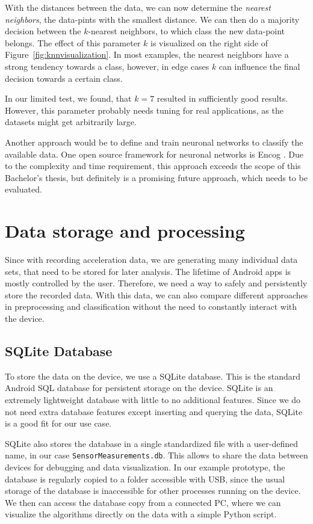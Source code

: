 With the distances between the data, we can now determine the \emph{nearest neighbors}, \ie the data-pints with the smallest distance. We can then do a majority decision between the $k$-nearest neighbors, to which class the new data-point belongs. The effect of this parameter $k$ is visualized on the right side of Figure~\ref{fig:knnvisualization}. In most examples, the nearest neighbors have a strong tendency towards a class, however, in edge cases $k$ can influence the final decision towards a certain class.

In our limited test, we found, that $k = 7$ resulted in sufficiently good results. However, this parameter probably needs tuning for real applications, as the datasets might get arbitrarily large.

Another approach would be to define and train neuronal networks to classify the available data. One open source framework for neuronal networks is Encog \cite{heaton2016encog}. Due to the complexity and time requirement, this approach exceeds the scope of this Bachelor's thesis, but definitely is a promising future approach, which needs to be evaluated.

\section{Data storage and processing}
Since with recording acceleration data, we are generating many individual data sets, that need to be stored for later analysis. The lifetime of Android apps is mostly controlled by the user. Therefore, we need a way to safely and persistently store the recorded data. With this data, we can also compare different approaches in preprocessing and classification without the need to constantly interact with the device.

\subsection{SQLite Database}
To store the data on the device, we use a SQLite database. This is the standard Android SQL database for persistent storage on the device. SQLite is an extremely lightweight database with little to no additional features. Since we do not need extra database features except inserting and querying the data, SQLite is a good fit for our use case.

SQLite also stores the database in a single standardized file with a user-defined name, in our case \lstinline$SensorMeasurements.db$. This allows to share the data between devices for debugging and data visualization. In our example prototype, the database is regularly copied to a folder accessible with USB, since the usual storage of the database is inaccessible for other processes running on the device. We then can access the database copy from a connected PC, where we can visualize the algorithms directly on the data with a simple Python script.


